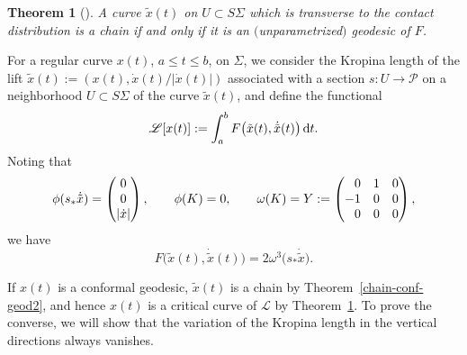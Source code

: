\documentclass[pdftex]{sigma}
\numberwithin{equation}{section}
\newtheorem{Theorem}{Theorem}[section]
\begin{document}
\begin{Theorem}[{\cite{CMMM}}]\label{chain-kropina}
A curve $\tilde x(t)$ on $U\subset S\Sigma$ which is transverse to the contact distribution is a chain if and only if it is an $($unparametrized$)$ geodesic of $F$.
\end{Theorem}

For a regular curve $x(t)$, $a\le t\le b$, on $\Sigma$, we consider the Kropina length of the lift
$\tilde x(t):=(x(t), \dot x(t)/|\dot x(t)|)$ associated with a section $s\colon U\to \mathcal{P}$ on a neighborhood $U\subset S\Sigma$ of the curve $\tilde x(t)$, and define the functional
\[
\mathscr{L}[x(t)]:=\int_a^b F\bigl(\tilde x(t), \dot{\tilde x}(t)\bigr)\, {\rm d}t.
\]
Noting that
\[
\phi(s_*\dot{\tilde x})=\begin{pmatrix}
0 \\ 0 \\ |\dot x|
\end{pmatrix}, \qquad \phi(K)=0, \qquad \omega(K)=Y:=\begin{pmatrix}
\hphantom{-}0 & 1 & 0\\
-1 & 0 & 0 \\
\hphantom{-}0& 0& 0
\end{pmatrix},
\]
we have
\[
F\bigl(\tilde x(t), \dot{\tilde x}(t)\bigr)=2\omega^3\bigl(s_*\dot{\tilde x}\bigr).
\]

If $x(t)$ is a conformal geodesic, $\tilde x(t)$ is a chain by Theorem~\ref{chain-conf-geod2}, and hence $x(t)$ is a critical curve of $\mathscr{L}$ by Theorem~\ref{chain-kropina}. To prove the converse, we will show that the variation of the Kropina length in the vertical directions always vanishes.
\end{document}
